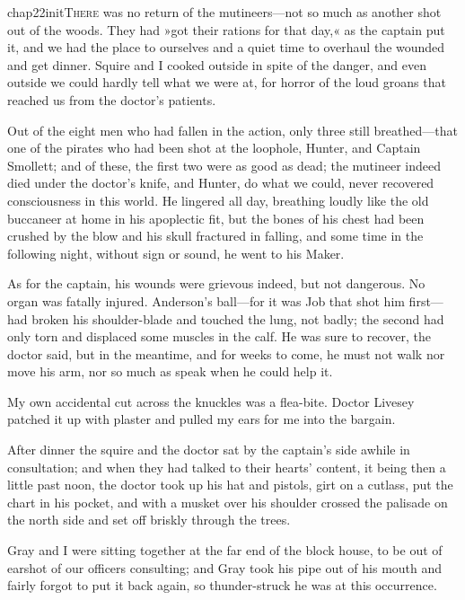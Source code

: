 
   \lettrine[lines=4,image=true]{chap22initT}{here} was no return of the mutineers—not so much as another shot out of the woods. They had »got their rations for that day,« as the captain put it, and we had the place to ourselves and a quiet time to overhaul the wounded and get dinner. Squire and I cooked outside in spite of the danger, and even outside we could hardly tell what we were at, for horror of the loud groans that reached us from the doctor's patients.

Out of the eight men who had fallen in the action, only three still breathed—that one of the pirates who had been shot at the loophole, Hunter, and Captain Smollett; and of these, the first two were as good as dead; the mutineer indeed died under the doctor's knife, and Hunter, do what we could, never recovered consciousness in this world. He lingered all day, breathing loudly like the old buccaneer at home in his apoplectic fit, but the bones of his chest had been crushed by the blow and his skull fractured in falling, and some time in the following night, without sign or sound, he went to his Maker.

As for the captain, his wounds were grievous indeed, but not dangerous. No organ was fatally injured. Anderson's ball—for it was Job that shot him first—had broken his shoulder-blade and touched the lung, not badly; the second had only torn and displaced some muscles in the calf. He was sure to recover, the doctor said, but in the meantime, and for weeks to come, he must not walk nor move his arm, nor so much as speak when he could help it.

My own accidental cut across the knuckles was a flea-bite. Doctor Livesey patched it up with plaster and pulled my ears for me into the bargain.

After dinner the squire and the doctor sat by the captain's side awhile in consultation; and when they had talked to their hearts' content, it being then a little past noon, the doctor took up his hat and pistols, girt on a cutlass, put the chart in his pocket, and with a musket over his shoulder crossed the palisade on the north side and set off briskly through the trees.

Gray and I were sitting together at the far end of the block house, to be out of earshot of our officers consulting; and Gray took his pipe out of his mouth and fairly forgot to put it back again, so thunder-struck he was at this occurrence.

